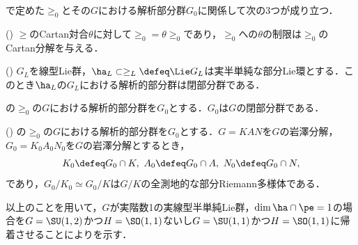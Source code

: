 で定めた$\ge_0$とその$G$における解析部分群$G_0$に関係して次の3つが成り立つ．
\begin{lem}(\cite[p.~409, Lemma~2.2]{hel01})
  $\ge$のCartan対合$\theta$に対して$\ge_0 = \theta\ge_0$であり，$\ge_0 $への$\theta$の制限は$\ge_0$のCartan分解を与える．
\end{lem}

\begin{thm}\label{thm:yos38}(\cite[p.~82]{yos38})
  $G_L$を線型Lie群，$\ha_{L} \subset \ge_{L}\defeq \Lie G_{L} $は実半単純な部分Lie環とする．このとき$\ha_{L} $の$G_{L} $における解析的部分群は閉部分群である．
\end{thm}
\begin{cor}
  の$\ge_0$の$G$における解析的部分群を$G_0$とする．$G_0 $は$G$の閉部分群である．
\end{cor}


\begin{lem}(\cite[p.~409, Lemma~2.3]{hel01}) の$\ge_0$の$G$における解析的部分群を$G_0$とする．$G = KAN$を$G$の岩澤分解，$G_0 = K_0A_0N_0$を$G$の岩澤分解とするとき，
  \begin{align*}
    K_0\defeq G_0\cap K,\ A_0 \defeq G_0\cap A,\ N_0\defeq G_0\cap N, 
  \end{align*}
  であり，$G_0/K_0 \simeq G_0/K$は$G/K$の全測地的な部分Riemann多様体である．
  
\end{lem}

以上のことを用いて，$G$が実階数1の実線型半単純Lie群，$\dim \ha\cap\pe = 1 $の場合を$G= \SU(1,2) $かつ$H = \SO(1,1) $ないし$G = \SU(1,1) $かつ$H = \SO(1,1) $に帰着させることによりを示す．

